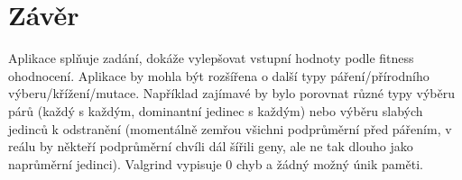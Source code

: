 \documentclass{article}
\begin{document}
\section{Závěr}

Aplikace splňuje zadání, dokáže vylepšovat vstupní hodnoty podle fitness ohodnocení. Aplikace by mohla být rozšířena o další typy páření/přírodního výberu/křížení/mutace. Například zajímavé by bylo porovnat různé typy výběru párů (každý s každým, dominantní jedinec s každým) nebo výběru slabých jedinců k odstranění (momentálně zemřou všichni podprůměrní před pářením, v reálu by někteří podprůměrní chvíli dál šířili geny, ale ne tak dlouho jako naprůměrní jedinci).
Valgrind vypisuje 0 chyb a žádný možný únik paměti.



  
    
\end{document}
